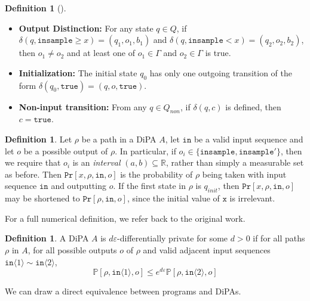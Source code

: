 \documentclass[12pt]{article}
\newcommand{\RR}{\mathbb{R}}
\newcommand{\PP}{\mathbb{P}}
\newcommand{\gguard}[1][x]{\texttt{insample}\geq #1}
\newcommand{\lguard}[1][x]{\texttt{insample} < #1}
\newcommand{\brangle}[1]{\langle #1 \rangle}
\theoremstyle{definition}
\newtheorem{defn}[thm]{Definition}
\begin{document}
\begin{defn}[\cite{chadhaLinearTimeDecidability2021}]
\begin{itemize}
        \item \textbf{Output Distinction:} For any state $q\in Q$, if $\delta(q, \gguard) = (q_1, o_1, b_1)$ and $\delta(q, \lguard) = (q_2, o_2, b_2)$, then $o_1\neq o_2$ and at least one of $o_1\in \Gamma$ and $o_2\in \Gamma$ is true.

        \item \textbf{Initialization:} The initial state $q_0$ has only one outgoing transition of the form $\delta(q_0, \texttt{true}) = (q, o, \texttt{true})$.

        \item \textbf{Non-input transition:} From any $q\in Q_{non}$, if $\delta(q, c)$ is defined, then $c=\texttt{true}$.
    \end{itemize}
\end{defn}

\begin{defn}
    Let $\rho$ be a path in a DiPA $A$, let $\texttt{in}$ be a valid input sequence and let $o$ be a possible output of $\rho$. In particular, if $o_i\in \{\texttt{insample}, \texttt{insample}'\}$, then we require that $o_i$ is an \textit{interval} $(a, b)\subseteq \RR$, rather than simply a measurable set as before. 
    Then $\texttt{Pr}[x, \rho, \texttt{in}, o]$ is the probability of $\rho$ being taken with input sequence $\texttt{in}$ and outputting $o$. If the first state in $\rho$ is $q_{init}$, then $\texttt{Pr}[x, \rho, \texttt{in}, o]$ may be shortened to $\texttt{Pr}[\rho, \texttt{in}, o]$, since the initial value of $\texttt{x}$ is irrelevant.
\end{defn}

For a full numerical definition, we refer back to the original work. 

\begin{defn}
    A DiPA $A$ is $d\varepsilon$-differentially private for some $d>0$ if for all paths $\rho$ in $A$, for all possible outputs $o$ of $\rho$ and valid adjacent input sequences $\texttt{in}\brangle{1}\sim \texttt{in}\brangle{2}$, \[
        \PP[\rho, \texttt{in}\brangle{1}, o]\leq e^{d\varepsilon} \PP[\rho, \texttt{in}\brangle{2}, o]
    \]
\end{defn}

We can draw a direct equivalence between programs and DiPAs.
\end{document}
